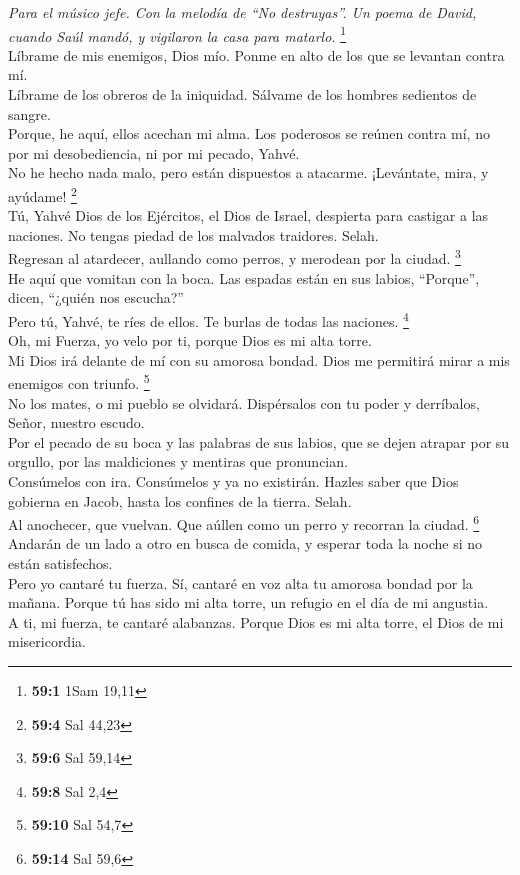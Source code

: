\emph{Para el músico jefe. Con la melodía de ``No destruyas''. Un poema
de David, cuando Saúl mandó, y vigilaron la casa para matarlo.}
\footnote{\textbf{59:1} 1Sam 19,11}\\
 Líbrame de mis enemigos, Dios mío. Ponme en alto de los
que se levantan contra mí.\\
 Líbrame de los obreros de la iniquidad. Sálvame de los
hombres sedientos de sangre.\\
 Porque, he aquí, ellos acechan mi alma. Los poderosos se
reúnen contra mí, no por mi desobediencia, ni por mi pecado, Yahvé.\\
 No he hecho nada malo, pero están dispuestos a atacarme.
¡Levántate, mira, y ayúdame! \footnote{\textbf{59:4} Sal 44,23}\\
 Tú, Yahvé Dios de los Ejércitos, el Dios de Israel,
despierta para castigar a las naciones. No tengas piedad de los malvados
traidores. Selah.\\
 Regresan al atardecer, aullando como perros, y merodean
por la ciudad. \footnote{\textbf{59:6} Sal 59,14}\\
 He aquí que vomitan con la boca. Las espadas están en sus
labios, ``Porque'', dicen, ``¿quién nos escucha?''\\
 Pero tú, Yahvé, te ríes de ellos. Te burlas de todas las
naciones. \footnote{\textbf{59:8} Sal 2,4}\\
 Oh, mi Fuerza, yo velo por ti, porque Dios es mi alta
torre.\\
 Mi Dios irá delante de mí con su amorosa bondad. Dios me
permitirá mirar a mis enemigos con triunfo. \footnote{\textbf{59:10} Sal
  54,7}\\
 No los mates, o mi pueblo se olvidará. Dispérsalos con
tu poder y derríbalos, Señor, nuestro escudo.\\
 Por el pecado de su boca y las palabras de sus labios,
que se dejen atrapar por su orgullo, por las maldiciones y mentiras que
pronuncian.\\
 Consúmelos con ira. Consúmelos y ya no existirán. Hazles
saber que Dios gobierna en Jacob, hasta los confines de la tierra.
Selah.\\
 Al anochecer, que vuelvan. Que aúllen como un perro y
recorran la ciudad. \footnote{\textbf{59:14} Sal 59,6}\\
 Andarán de un lado a otro en busca de comida, y esperar
toda la noche si no están satisfechos.\\
 Pero yo cantaré tu fuerza. Sí, cantaré en voz alta tu
amorosa bondad por la mañana. Porque tú has sido mi alta torre, un
refugio en el día de mi angustia.\\
 A ti, mi fuerza, te cantaré alabanzas. Porque Dios es mi
alta torre, el Dios de mi misericordia.


